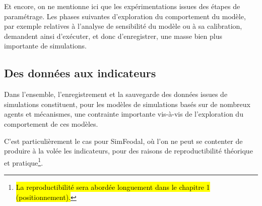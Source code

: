 	Et encore, on ne mentionne ici que les expérimentations issues des étapes de paramétrage.
	Les phases suivantes d'exploration du comportement du modèle, par exemple relatives à l'analyse de sensibilité du modèle ou à sa calibration, demandent ainsi d'exécuter, et donc d'enregistrer, une masse bien plus importante de simulations.

	\subsection{Des données aux indicateurs}\label{subsec:donnees-indicateurs}
	
	Dans l'ensemble, l'enregistrement et la sauvegarde des données issues de simulations constituent, pour les modèles de simulations basés sur de nombreux agents et mécanismes, une contrainte importante vis-à-vis de l'exploration du comportement de ces modèles.
	
	C'est particulièrement le cas pour SimFeodal, où l'on ne peut se contenter de produire à la volée les indicateurs, pour des raisons de reproductibilité théorique et pratique\footnote{
	\hl{La reproductibilité sera abordée \og longuement\fg{} dans le chapitre 1 (positionnement).}
	}. 

